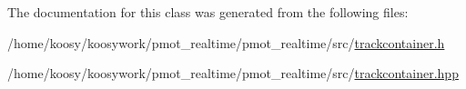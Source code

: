 \-The documentation for this class was generated from the following files\-:\begin{DoxyCompactItemize}
\item 
/home/koosy/koosywork/pmot\-\_\-realtime/pmot\-\_\-realtime/src/\hyperlink{trackcontainer_8h}{trackcontainer.\-h}\item 
/home/koosy/koosywork/pmot\-\_\-realtime/pmot\-\_\-realtime/src/\hyperlink{trackcontainer_8hpp}{trackcontainer.\-hpp}\end{DoxyCompactItemize}

